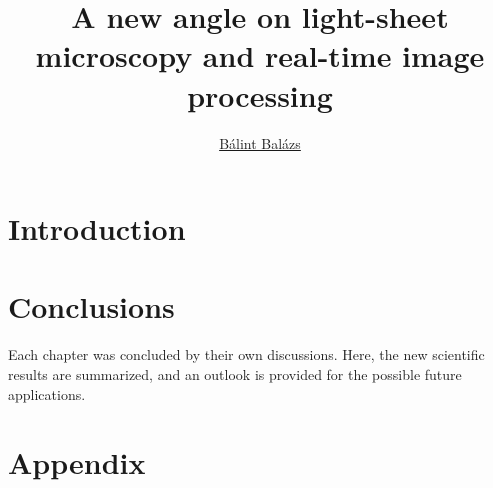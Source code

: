 \documentclass{diploma_style}
\author{\href{mailto:balint.balazs@embl.de}{Bálint Balázs}}
\title{A new angle on light-sheet microscopy and real-time image processing}
\begin{document}
\pagestyle{plain}

\maketitle
{}





\tableofcontents
\pagestyle{fancy}


\listoffigures
{}

\listoftables
{}

\glsaddall[types={\acronymtype}]
\printglossary[type=\acronymtype, title=List of Abbreviations, toctitle=List of Abbreviations]



\cleardoublepage
\setcounter{page}{1}

\chapter*{Introduction}

\cleardoublepage










\chapter{Conclusions}

Each chapter was concluded by their own discussions. Here, the new scientific results are summarized, and an outlook is provided for the possible future applications.

\graphicspath{{./}}
\label{ch:discussion}




\chapter*{Appendix}
\setcounter{table}{0}
\setcounter{figure}{0}
\setcounter{section}{0}
\renewcommand{\thesection}{\Alph{section}}
\renewcommand{\thetable}{\Alph{section}\arabic{table}}
\renewcommand{\thefigure}{\Alph{section}\arabic{figure}}
\end{document}
